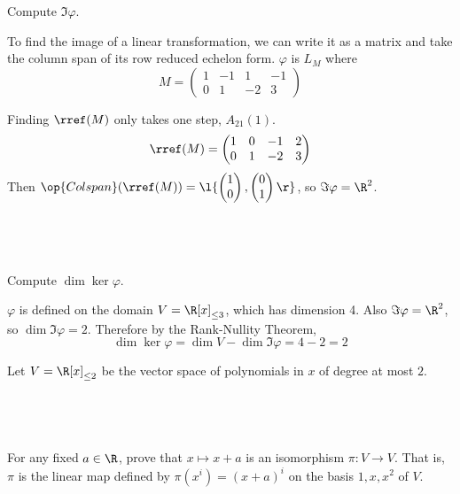 \documentclass[a4paper]{article}
\begin{document}
\begin{questionbody}
Compute $\Im \varphi$.
\end{questionbody}

To find the image of a linear transformation, we can write it as a matrix and take the column span of its row reduced echelon form. $\varphi$ is $L_M$ where \[ M = \begin{pmatrix} 1 & -1 & 1 & -1 \\ 0 & 1 & -2 & 3 \end{pmatrix} \]

Finding $\rref(M)$ only takes one step, $A_{21}(1)$. \[
\rref(M) = \begin{pmatrix} 1 & 0 & -1 & 2 \\ 0 & 1 & -2 & 3 \end{pmatrix}
\] Then $\op{Colspan}(\rref(M)) = \l\{ \begin{pmatrix}1 \\ 0\end{pmatrix}, \begin{pmatrix}0 \\ 1\end{pmatrix} \r\}$, so $\Im \varphi = \R^2$.

\subsection{~} %

\begin{questionbody}
Compute $\dim \ker \varphi$.
\end{questionbody}

$\varphi$ is defined on the domain $V = {\R[x]}_{\le 3}$, which has dimension 4. Also $\Im \varphi = \R^2$, so $\dim \Im \varphi = 2$. Therefore by the Rank-Nullity Theorem, \[
\dim \ker \varphi = \dim V - \dim \Im \varphi = 4 - 2 = 2
\]



\begin{questionbody}
Let $V = {\R[x]}_{\le 2}$ be the vector space of polynomials in $x$ of degree at most $2$.
\end{questionbody}

\subsection{~} %

\begin{questionbody}
For any fixed $a \in \R$, prove that $x \mapsto x+a$ is an isomorphism $\pi \colon V \to V$. That is, $\pi$ is the linear map defined by $\pi(x^i) = {(x + a)}^i$ on the basis $1, x, x^2$ of $V$.
\end{questionbody}
\end{document}
